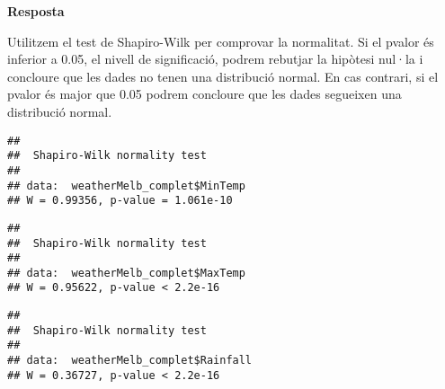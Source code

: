 \documentclass[
]{article}
\newenvironment{Shaded}{\begin{snugshade}}{\end{snugshade}}
\newcommand{\CommentTok}[1]{\textcolor[rgb]{0.56,0.35,0.01}{\textit{#1}}}
\newcommand{\KeywordTok}[1]{\textcolor[rgb]{0.13,0.29,0.53}{\textbf{#1}}}
\newcommand{\NormalTok}[1]{#1}
\newcommand{\OperatorTok}[1]{\textcolor[rgb]{0.81,0.36,0.00}{\textbf{#1}}}
\begin{document}
\textbf{Resposta}

Utilitzem el test de Shapiro-Wilk per comprovar la normalitat. Si el
pvalor és inferior a 0.05, el nivell de significació, podrem rebutjar la
hipòtesi nul·la i concloure que les dades no tenen una distribució
normal. En cas contrari, si el pvalor és major que 0.05 podrem concloure
que les dades segueixen una distribució normal.

\begin{Shaded}
\end{Shaded}

\begin{verbatim}
## 
##  Shapiro-Wilk normality test
## 
## data:  weatherMelb_complet$MinTemp
## W = 0.99356, p-value = 1.061e-10
\end{verbatim}

\begin{Shaded}
\end{Shaded}

\begin{verbatim}
## 
##  Shapiro-Wilk normality test
## 
## data:  weatherMelb_complet$MaxTemp
## W = 0.95622, p-value < 2.2e-16
\end{verbatim}

\begin{Shaded}
\end{Shaded}

\begin{verbatim}
## 
##  Shapiro-Wilk normality test
## 
## data:  weatherMelb_complet$Rainfall
## W = 0.36727, p-value < 2.2e-16
\end{verbatim}

\begin{Shaded}
\end{Shaded}
\end{document}
